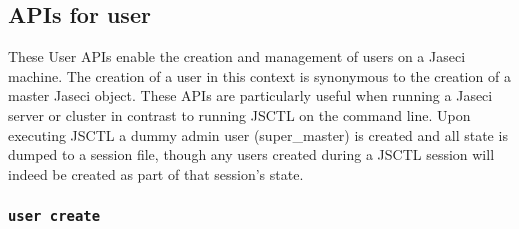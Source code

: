 \subsection{APIs for user}

\par
These User APIs enable the creation and management of users on a Jaseci machine.
The creation of a user in this context is synonymous to the creation of a master
Jaseci object. These APIs are particularly useful when running a Jaseci server
or cluster in contrast to running JSCTL on the command line. Upon executing JSCTL
a dummy admin user (super\_master) is created and all state is dumped to a session
file, though any users created during a JSCTL session will indeed be created as
part of that session's state.

\subsubsection{\lstinline[basicstyle=\Large\ttfamily]$user create$}


